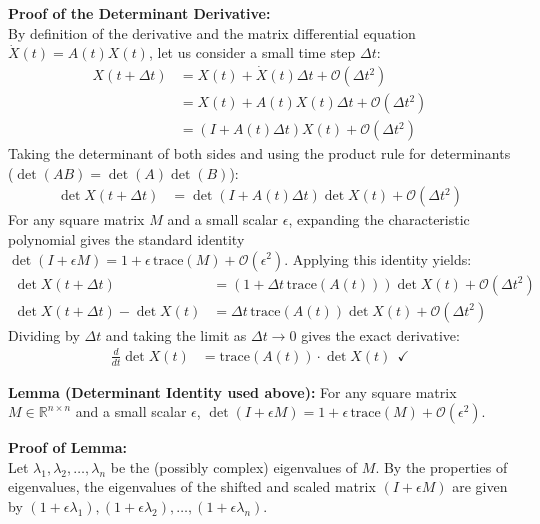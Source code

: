 \documentclass[twoside]{article}
\begin{document}
\textbf{Proof of the Determinant Derivative:} \\
By definition of the derivative and the matrix differential equation $\dot{X}(t) = A(t)X(t)$, let us consider a small time step $\Delta t$:
\begin{align*}
    X(t + \Delta t) &= X(t) + \dot{X}(t) \Delta t + \mathcal{O}(\Delta t^2) \\
    &= X(t) + A(t) X(t) \Delta t + \mathcal{O}(\Delta t^2) \\
    &= \left( I + A(t) \Delta t \right) X(t) + \mathcal{O}(\Delta t^2)
\end{align*}
Taking the determinant of both sides and using the product rule for determinants ($\det(AB) = \det(A)\det(B)$):
\begin{align*}
    \det X(t + \Delta t) &= \det \left( I + A(t) \Delta t \right) \det X(t) + \mathcal{O}(\Delta t^2)
\end{align*}
For any square matrix $M$ and a small scalar $\epsilon$, expanding the characteristic polynomial gives the standard identity $\det(I + \epsilon M) = 1 + \epsilon \, \mathrm{trace}(M) + \mathcal{O}(\epsilon^2)$. Applying this identity yields:
\begin{align*}
    \det X(t + \Delta t) &= \left( 1 + \Delta t \, \mathrm{trace}(A(t)) \right) \det X(t) + \mathcal{O}(\Delta t^2) \\
    \det X(t + \Delta t) - \det X(t) &= \Delta t \, \mathrm{trace}(A(t)) \det X(t) + \mathcal{O}(\Delta t^2)
\end{align*}
Dividing by $\Delta t$ and taking the limit as $\Delta t \to 0$ gives the exact derivative:
\begin{align*}
    \frac{d}{dt} \det X(t) &= \mathrm{trace}(A(t)) \cdot \det X(t) \ \ \checkmark
\end{align*}
\vspace{6pt}

\textbf{Lemma (Determinant Identity used above):} For any square matrix $M \in \mathbb{R}^{n \times n}$ and a small scalar $\epsilon$, $\det(I + \epsilon M) = 1 + \epsilon \, \mathrm{trace}(M) + \mathcal{O}(\epsilon^2)$.

\textbf{Proof of Lemma:} \\
Let $\lambda_1, \lambda_2, \dots, \lambda_n$ be the (possibly complex) eigenvalues of $M$. By the properties of eigenvalues, the eigenvalues of the shifted and scaled matrix $(I + \epsilon M)$ are given by $(1 + \epsilon \lambda_1), (1 + \epsilon \lambda_2), \dots, (1 + \epsilon \lambda_n)$.
\end{document}
